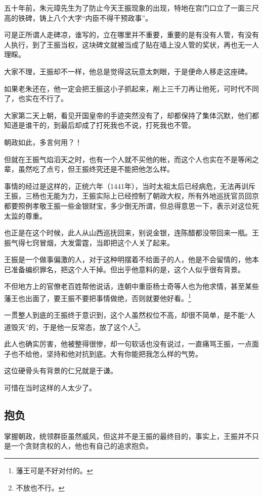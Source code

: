 \begin{multicols}{\theparacolNo}
五十年前，朱元璋先生为了防止今天王振现象的出现，特地在宫门口立了一面三尺高的铁碑，铸上八个大字“内臣不得干预政事”。

可是正所谓人走碑凉，谁写的，立在哪里并不重要，重要的是有没有人管，有没有人执行，到了王振当权，这块碑文就被当成了贴在墙上没人管的奖状，再也无一人理睬。

大家不理，王振却不一样，他总是觉得这玩意太刺眼，于是便命人移走这座碑。

如果老朱还在，他一定会把王振这小子抓起来，剐上三千刀再让他死，可时代不同了，也实在不行了。

大家第二天上朝，看见开国皇帝的手迹突然没有了，却都保持了集体沉默，他们都知道是谁干的，到最后却成了打死我也不说，打死我也不管。

朝政如此，多言何用？！

但就在王振气焰滔天之时，也有一个人就不买他的帐，而这个人也实在不是等闲之辈，虽然吃了点亏，但王振终究还是不能把他怎么样。

事情的经过是这样的，正统六年（1441年），当时太祖太后已经病危，无法再训斥王振，三杨也无能为力，王振实际上已经控制了朝政大权，所有外地巡抚官员回京都要照例孝敬王振一些金银财宝，多少倒无所谓，但总得意思一下，表示对这位死太监的尊重。

也正是在这个时候，此人从山西巡抚回来，别说金银，连陈醋都没带回来一瓶。王振气得七窍冒烟，大发雷霆，当即把这个人关了起来。

王振是一个做事偏激的人，对于这种明摆着不给面子的人，他是不会留情的，他本已准备编织罪名，把这个人干掉。但出乎他意料的是，这个人似乎很有背景。

不但地方上的官僚老百姓帮他说话，连朝中重臣杨士奇等人也为他求情，甚至某些藩王也出面了，要王振不要把事情做绝，否则就要他好看。\footnote{藩王可是不好对付的。}

一贯整人到底的王振终于意识到，这个人虽然权位不高，却很不简单，是不能“人道毁灭”的，于是他一反常态，放了这个人\footnote{不放也不行。}。

此人也确实厉害，他被整得很惨，却一句软话也没有说过，一直痛骂王振，一点面子也不给他，坚持和他对抗到底。大有你能把我怎么样的气势。

这位硬骨头有背景的仁兄就是于谦。

可惜在当时这样的人太少了。

\subsection{抱负}
掌握朝政，统领群臣虽然威风，但这并不是王振的最终目的，事实上，王振并不只是一个贪财贪权的人，他也有自己的追求抱负。


\end{multicols}
